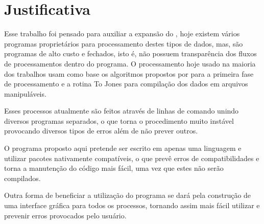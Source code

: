 \chapter{Justificativa}
\label{cap-justificativa}

    Esse trabalho foi pensado para auxiliar a expansão do \MT, hoje existem vários programas proprietários para processamento destes tipos de dados, mas, são programas de alto custo e fechados, isto é, não possuem transparência dos fluxos de processamentos dentro do programa. O processamento hoje usado na maioria dos trabalhos usam como base os algoritmos propostos por \citeauthor{egbert97} para a primeira fase de processamento e a rotina To Jones \cite{egbert97} para compilação dos dados em arquivos manipuláveis.
    
    Esses processos atualmente são feitos através de linhas de comando unindo diversos programas separados, o que torna o procedimento muito instável provocando diversos tipos de erros além de não prever outros. %
    
    O programa proposto aqui pretende ser escrito em apenas uma linguagem e utilizar pacotes nativamente compatíveis, o que prevê erros de compatibilidades e torna a manutenção do código mais fácil, uma vez que estes não serão compilados.
    
    Outra forma de beneficiar a utilização do programa se dará pela construção de uma interface gráfica para todos os processos, tornando assim mais fácil utilizar e prevenir erros provocados pelo usuário.    
    
    
